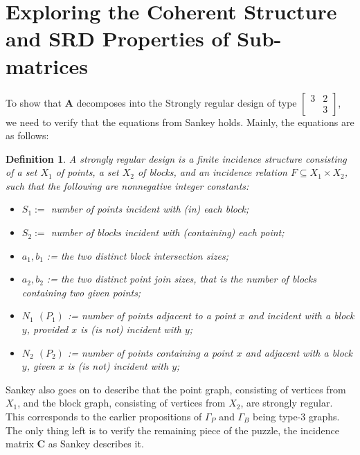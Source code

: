 \documentclass{article}
\newtheorem{definition}{Definition}
\begin{document}
\section{Exploring the Coherent Structure and SRD Properties of Sub-matrices}
To show that \(\mathbf{A}\) decomposes into the Strongly regular design of type \(\begin{bmatrix}
    3 & 2 \\
    & 3
\end{bmatrix}\), we need to verify that the equations from Sankey holds. Mainly, the equations are as follows:
\begin{definition}
    A strongly regular design is a finite incidence structure consisting of a set \(X_1\) of points, a set \(X_2\) of blocks, and an incidence relation \(F \subseteq X_1 \times X_2\), such that the following are nonnegative integer constants:
    \begin{itemize}
        \item \(S_1 :=\) number of points incident with (in) each block;
        \item \(S_2 :=\) number of blocks incident with (containing) each point;
        \item \(a_1,b_1\) := the two distinct block intersection sizes;
        \item \(a_2,b_2\) := the two distinct point join sizes, that is the number of blocks containing two given points;
        \item \(N_1\) \((P_1)\) := number of points adjacent to a point \(x\) and incident with a block \(y\), provided \(x\) is (is not) incident with \(y\);
        \item \(N_2\) \((P_2)\) := number of points containing a point \(x\) and adjacent with a block \(y\), given \(x\) is (is not) incident with \(y\);
    \end{itemize}
\end{definition}
Sankey also goes on to describe that the point graph, consisting of vertices from \(X_1\), and the block graph, consisting of vertices from \(X_2\), are strongly regular. This corresponds to the earlier propositions of \(\Gamma_P\) and \(\Gamma_B\) being type-3 graphs.\\
The only thing left is to verify the remaining piece of the puzzle, the incidence matrix \(\mathbf{C}\) as Sankey describes it.
\end{document}
